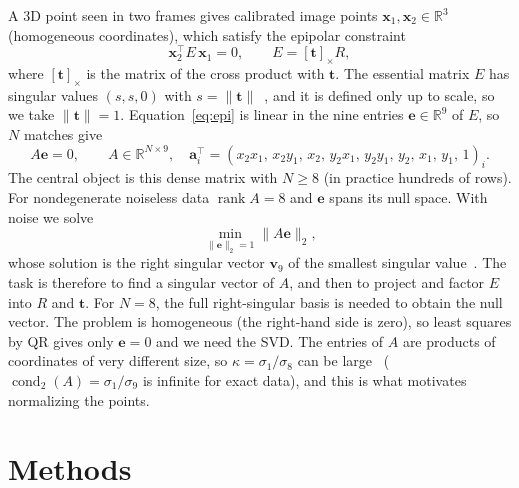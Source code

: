 \documentclass[11pt,a4paper]{article}
\newif\ifshowguide
\newcommand{\bR}{\mathbb{R}}
\newcommand{\bx}{\mathbf{x}}
\DeclareMathOperator{\rank}{rank}
\DeclareMathOperator{\cond}{cond}
\theoremstyle{plain}
\theoremstyle{definition}
\theoremstyle{remark}
\newcommand{\guide}[1]{\ifshowguide\par\smallskip\noindent
  \colorbox{gray!12}{\parbox{\dimexpr\linewidth-2\fboxsep}{\small\itshape
  \textbf{Guidance.} #1}}\par\smallskip\fi}
\begin{document}
A 3D point seen in two frames gives calibrated image points $\bx_1,\bx_2\in\bR^3$ (homogeneous coordinates), which satisfy the epipolar constraint
\begin{equation}\label{eq:epi}
  \bx_2^{\top}E\,\bx_1=0,
  \qquad
  E=[\mathbf{t}]_{\times}R,
\end{equation}
where $[\mathbf{t}]_{\times}$ is the matrix of the cross product with $\mathbf{t}$. The essential matrix $E$ has singular values $(s,s,0)$ with $s=\|\mathbf{t}\|$~\cite[Ch.~9]{HartleyZisserman}, and it is defined only up to scale, so we take $\|\mathbf{t}\|=1$. Equation~\eqref{eq:epi} is linear in the nine entries $\mathbf{e}\in\bR^9$ of $E$, so $N$ matches give
\begin{equation}\label{eq:Ae}
  A\mathbf{e}=0,
  \qquad
  A\in\bR^{N\times 9},
  \quad
  \mathbf{a}_i^{\top}=(x_2x_1,\,x_2y_1,\,x_2,\,y_2x_1,\,y_2y_1,\,y_2,\,x_1,\,y_1,\,1)_i .
\end{equation}
The central object is this dense matrix with $N\ge 8$ (in practice hundreds of rows). For nondegenerate noiseless data $\rank A=8$ and $\mathbf{e}$ spans its null space. With noise we solve
\begin{equation}\label{eq:hls}
  \min_{\|\mathbf{e}\|_2=1}\|A\mathbf{e}\|_2,
\end{equation}
whose solution is the right singular vector $\mathbf{v}_9$ of the smallest singular value~\cite[App.~A5]{HartleyZisserman}. The task is therefore to find a singular vector of $A$, and then to project and factor $E$ into $R$ and $\mathbf{t}$. For $N=8$, the full right-singular basis is needed to obtain the null vector. The problem is homogeneous (the right-hand side is zero), so least squares by QR gives only $\mathbf{e}=0$ and we need the SVD. The entries of $A$ are products of coordinates of very different size, so $\kappa=\sigma_1/\sigma_8$ can be large~\cite{Hartley97} ($\cond_2(A)=\sigma_1/\sigma_9$ is infinite for exact data), and this is what motivates normalizing the points.

\section{Methods}
\label{sec:methods}

\guide{Criteria B and C. At most two algorithms. For each: the key idea,
explained in your own words; the central claims, proved or sketched
(say which, and cite the source of any proof you do not give); the cost
in flops and memory, as a function of the problem size; and the
conditions under which it fails or becomes slow.
\emph{Interim report 1}: the candidate approaches, their pros and cons,
and their predicted cost.}
\end{document}
